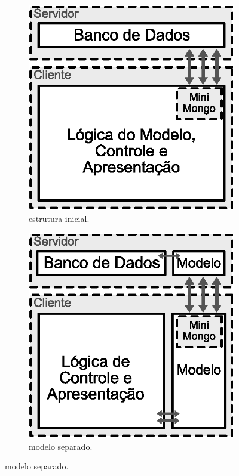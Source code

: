 \begin{figure}[h!]
	\centering
	\begin{subfigure}{.34\textwidth}
  		\centering
  		\includegraphics[width=.9\linewidth]{figuras/arquitetura1.eps}
  		\caption{estrutura inicial.}
  		\label{fig:subarq1}
	\end{subfigure}%
 	 \begin{subfigure}{.34\textwidth}
  		\centering
  		\includegraphics[width=.9\linewidth]{figuras/arquitetura2.eps}
  		\caption{modelo separado.}
  		\label{fig:subarq2}
	\end{subfigure}%


\end{figure}
